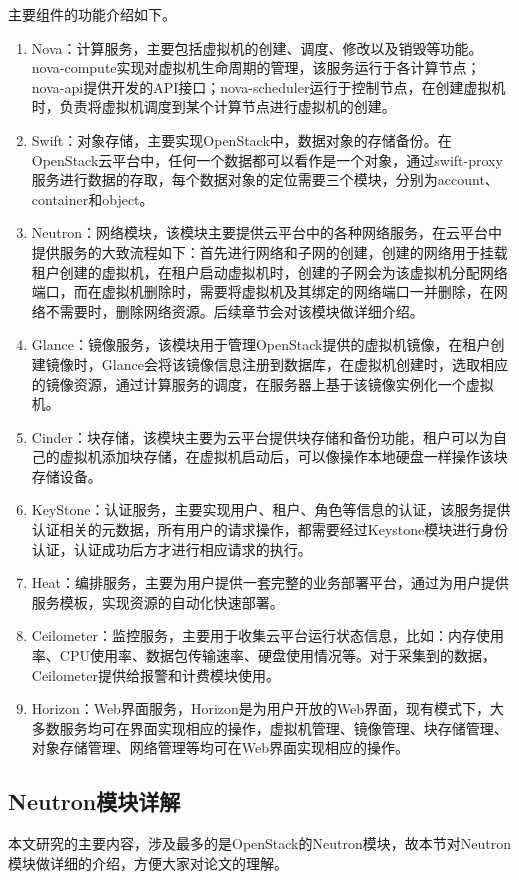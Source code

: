 主要组件的功能介绍如下\cite{OpenStack-3}。

\begin{enumerate}
\item Nova：计算服务，主要包括虚拟机的创建、调度、修改以及销毁等功能。nova-compute实现对虚拟机生命周期的管理，该服务运行于各计算节点；nova-api提供开发的API接口；nova-scheduler运行于控制节点，在创建虚拟机时，负责将虚拟机调度到某个计算节点进行虚拟机的创建。
\item Swift：对象存储，主要实现OpenStack中，数据对象的存储备份。在OpenStack云平台中，任何一个数据都可以看作是一个对象，通过swift-proxy服务进行数据的存取，每个数据对象的定位需要三个模块，分别为account、container和object。
\item Neutron：网络模块，该模块主要提供云平台中的各种网络服务，在云平台中提供服务的大致流程如下：首先进行网络和子网的创建，创建的网络用于挂载租户创建的虚拟机，在租户启动虚拟机时，创建的子网会为该虚拟机分配网络端口，而在虚拟机删除时，需要将虚拟机及其绑定的网络端口一并删除，在网络不需要时，删除网络资源。后续章节会对该模块做详细介绍。
\item Glance：镜像服务，该模块用于管理OpenStack提供的虚拟机镜像，在租户创建镜像时，Glance会将该镜像信息注册到数据库，在虚拟机创建时，选取相应的镜像资源，通过计算服务的调度，在服务器上基于该镜像实例化一个虚拟机。
\item Cinder：块存储，该模块主要为云平台提供块存储和备份功能，租户可以为自己的虚拟机添加块存储，在虚拟机启动后，可以像操作本地硬盘一样操作该块存储设备。
\item KeyStone：认证服务，主要实现用户、租户、角色等信息的认证，该服务提供认证相关的元数据，所有用户的请求操作，都需要经过Keystone模块进行身份认证，认证成功后方才进行相应请求的执行。
\item Heat：编排服务，主要为用户提供一套完整的业务部署平台，通过为用户提供服务模板，实现资源的自动化快速部署。
\item Ceilometer：监控服务，主要用于收集云平台运行状态信息，比如：内存使用率、CPU使用率、数据包传输速率、硬盘使用情况等。对于采集到的数据，Ceilometer提供给报警和计费模块使用。
\item Horizon：Web界面服务，Horizon是为用户开放的Web界面，现有模式下，大多数服务均可在界面实现相应的操作，虚拟机管理、镜像管理、块存储管理、对象存储管理、网络管理等均可在Web界面实现相应的操作。
\end{enumerate}
\subsection{Neutron模块详解}
本文研究的主要内容，涉及最多的是OpenStack的Neutron模块，故本节对Neutron模块做详细的介绍，方便大家对论文的理解。


